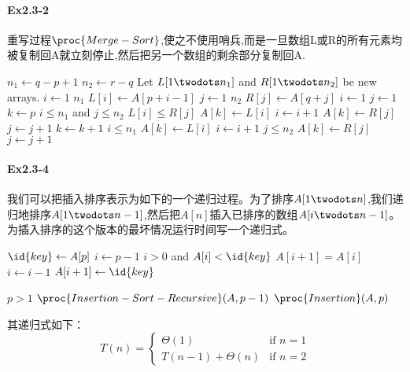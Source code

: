 \documentclass[a4paper,11pt]{article}
\begin{document}
\paragraph*{Ex2.3-2}
重写过程$\proc{Merge-Sort}$,使之不使用哨兵,而是一旦数组L或R的所有元素均被复制回A就立刻停止,然后把另一个数组的剩余部分复制回A.
\begin{codebox}
	\li $n_1 \gets q -p + 1$
	\li $n_2 \gets r - q$
	\li Let $L[1 \twodots n_1]$ and $R[1 \twodots n_2]$ be new arrays.
	\li \For $i \gets 1$ \To $n_1$
	\li		\Do
				$L[i] \gets A[p + i - 1]$
			\End
	\li	\For $j \gets 1$ \To $n_2$
	\li 	\Do
				$R[j] \gets A[q + j]$
			\End
	\li $i \gets 1$
	\li	$j \gets 1$
	\li $k \gets p$
	\li \While $i \leq n_1$ and $j \leq n_2$
	\li		\Do
				\If $L[i] \leq R[j]$
	\li			\Then 
					$A[k] \gets L[i]$
	\li 			$i \gets i + 1$
	\li			\Else
	\li				$A[k] \gets R[j]$
	\li				$j \gets j + 1$
				\End
	\li			$k \gets k + 1$
			\End
	\li	\While $i \leq n_1$
	\li \Do
			$A[k] \gets L[i]$
	\li		$i \gets i + 1$
		\End
	\li \While $j \leq n_2$
	\li \Do
			$A[k] \gets R[j]$
	\li		$j \gets j + 1$
		\End
\end{codebox}
\paragraph*{Ex2.3-4}
我们可以把插入排序表示为如下的一个递归过程。为了排序$A[1 \twodots n]$,我们递归地排序$A[1 \twodots n-1]$,然后把$A[n]$插入已排序的数组$A[i \twodots n-1]$。为插入排序的这个版本的最坏情况运行时间写一个递归式。
\begin{codebox}
	\li $\id{key} \gets A[p]$
	\li $i \gets p-1$
	\li \While $i > 0$ and $A[i] < \id{key}$
	\li 	\Do
				$A[i + 1] = A[i]$
	\li			$i \gets i - 1$
			\End
	\li	$A[i + 1] \gets \id{key}$
\end{codebox}
\begin{codebox}
	\li \If $p > 1$
	\li	\Then
			$\proc{Insertion-Sort-Recursive}(A, p-1)$
	\li		$\proc{Insertion}(A, p)$		
		\End
\end{codebox}
\noindent 其递归式如下：
\[
	T(n) = 
	\begin{cases}
		         \Theta(1) & \text{if $n = 1$}\\
		T(n-1) + \Theta(n) & \text{if $n = 2$}
	\end{cases}
\]
\end{document}
